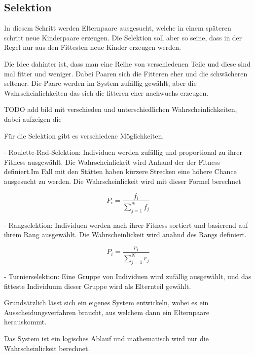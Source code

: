 %
%
%
%
\subsection{Selektion 
\label{genetic_algorithm:selection}}
In diesem Schritt werden Elternpaare ausgesucht, welche 
in einem späteren schritt neue Kinderpaare erzeugen. Die 
Selektion soll aber so seine, dass in der Regel nur aus 
den Fittesten neue Kinder erzeugen werden.

Die Idee dahinter ist, dass man eine Reihe von verschiedenen 
Teile und diese sind mal fitter und weniger. Dabei Paaren sich
die Fitteren eher und die schwächeren seltener. Die Paare werden 
im System zufällig gewählt, aber die Wahrscheinlichkeiten das 
sich die fitteren eher nachwuchs erzeugen.

TODO add bild mit verschieden und unterschiedlichen Wahrscheinlichkeiten,
dabei aufzeigen die 



Für die Selektion
gibt es verschiedene Möglichkeiten.

- Roulette-Rad-Selektion: Individuen werden zufällig und proportional 
zu ihrer Fitness ausgewählt. Die Wahrscheinlickeit wird Anhand der 
der Fitness definiert.Im Fall mit den Stätten haben kürzere 
Strecken eine höhere Chance ausgesucht zu werden.
Die Wahrscheinlickeit wird mit dieser Formel berechnet

\begin{equation}
    \label{eq:probability_fittest}
    P_i = \frac{f_i}{\sum_{j=1}^{N} f_j}
\end{equation}

- Rangselektion: Individuen werden nach ihrer Fitness sortiert 
und basierend auf ihrem Rang ausgewählt. Die Wahrscheinlickeit 
wird anahnd des Rangs definiert.

\begin{equation}
    \label{eq:probability_rating}
    P_i = \frac{r_i}{\sum_{j=1}^{N} r_j}
\end{equation}

- Turnierselektion: Eine Gruppe von Individuen wird zufällig 
ausgewählt, und das fitteste Individuum dieser Gruppe wird 
als Elternteil gewählt.

Grundsätzlich lässt sich ein eigenes System entwickeln, wobei
es ein Ausscheidungsverfahren braucht, aus welchem dann ein 
Elternpaare herauskommt.

Das System ist ein logisches Ablauf und mathematisch wird nur 
die Wahrscheinlickeit berechnet.

